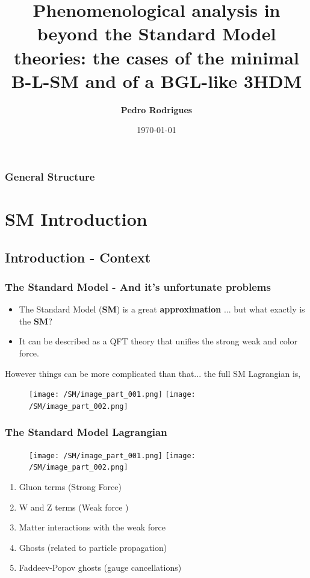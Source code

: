 \documentclass[10pt,xcolor=dvipsnames,mathserif]{beamer}
\title{Phenomenological analysis in beyond the Standard Model theories: the cases of the minimal B-L-SM and of a BGL-like 3HDM}
\author{\textbf{Pedro Rodrigues}}
\date{\today}
\institute{Universidade de Aveiro}
\begin{document}

\begin{frame}
	\titlepage
\end{frame}

\begin{frame}
	\frametitle{General Structure}
	\tableofcontents
\end{frame}	

\section{SM Introduction}

\subsection{Introduction - Context}

\begin{frame}
	\frametitle{The Standard Model - And it's unfortunate problems}
	\begin{itemize}
		\item The Standard Model (\textbf{SM}) is a great \textbf{approximation} \pause ... but what exactly is the \textbf{SM}? 
		\pause
		\item It can be described as a QFT theory that unifies the strong weak and color force.  
	\end{itemize}
	\pause
	However things can be more complicated than that... the full SM Lagrangian is,  
	\begin{figure}
		\texttt{[image: /SM/image\_part\_001.png]}
		\texttt{[image: /SM/image\_part\_002.png]}
	\end{figure}

\end{frame}

\begin{frame}
	\frametitle{The Standard Model Lagrangian}
	\begin{figure}
		\texttt{[image: /SM/image\_part\_001.png]}
		\texttt{[image: /SM/image\_part\_002.png]}
	\end{figure}

\begin{multicols}{2}
	\begin{enumerate}
		\item Gluon terms (Strong Force)
		\item W and Z terms (Weak force ) 
		\item Matter interactions with the weak force
		\item Ghosts (related to particle propagation)  
		\item Faddeev-Popov ghosts (gauge cancellations) 
	\end{enumerate}
\end{multicols}

\end{frame}
\end{document}

